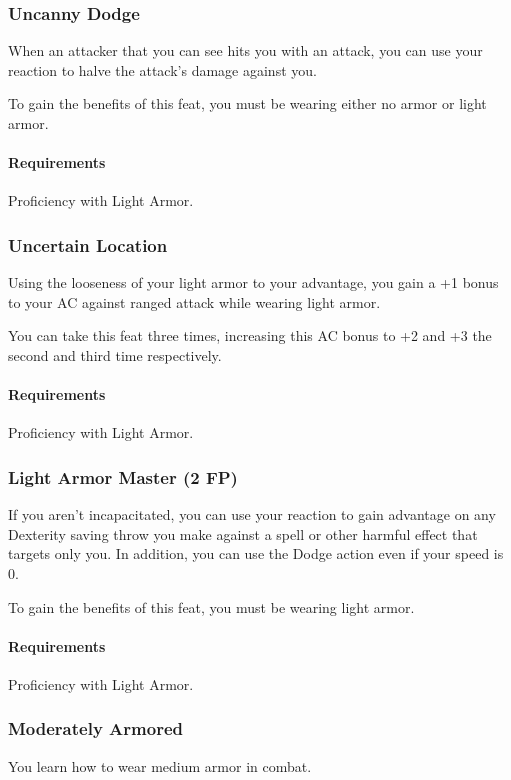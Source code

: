 \subsubsection{Uncanny Dodge} \label{feat::uncannydodge}
    When an attacker that you can see hits you with an attack, you can use your reaction to halve the attack's damage against you.

    To gain the benefits of this feat, you must be wearing either no armor or light armor.
    \paragraph{Requirements} Proficiency with Light Armor.
\subsubsection{Uncertain Location} \label{feat::uncertainlocation}
    Using the looseness of your light armor to your advantage, you gain a +1 bonus to your AC against ranged attack while wearing light armor.

    You can take this feat three times, increasing this AC bonus to +2 and +3 the second and third time respectively.
    \paragraph{Requirements} Proficiency with Light Armor.
\subsubsection{Light Armor Master (2 FP)} \label{feat::lightarmormaster}
    If you aren't incapacitated, you can use your reaction to gain advantage on any Dexterity saving throw you make against a spell or other harmful effect that targets only you.
    In addition, you can use the Dodge action even if your speed is 0.

    To gain the benefits of this feat, you must be wearing light armor.
    \paragraph{Requirements} Proficiency with Light Armor.
\subsubsection{Moderately Armored} \label{feat::moderatelyarmored}
    You learn how to wear medium armor in combat.
